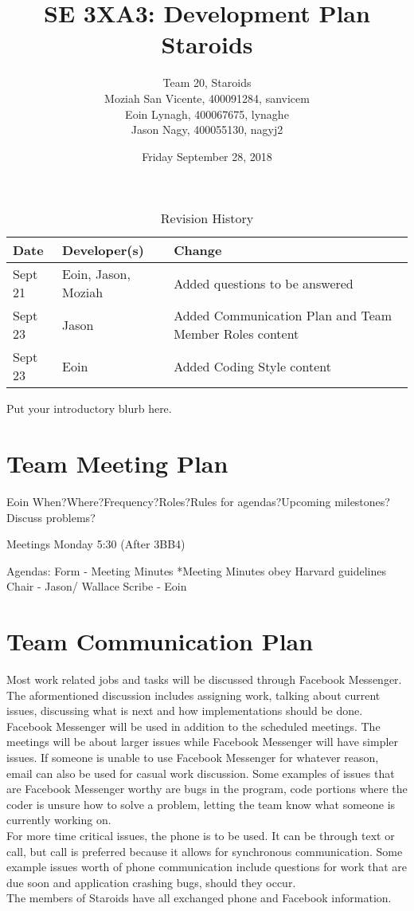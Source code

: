\documentclass{article}
\title{SE 3XA3: Development Plan\\Staroids}
\author{Team 20, Staroids
		\\ Moziah San Vicente, 400091284, sanvicem
		\\ Eoin Lynagh, 400067675, lynaghe
		\\ Jason Nagy, 400055130, nagyj2
}
\date{Friday September 28, 2018}
\begin{document}
\begin{table}[hp]
\caption{Revision History} \label{TblRevisionHistory}
\begin{tabularx}{\textwidth}{llX}
\toprule
\textbf{Date} & \textbf{Developer(s)} & \textbf{Change}\\
\midrule
Sept 21 & Eoin, Jason, Moziah & Added questions to be answered\\
Sept 23 & Jason & Added Communication Plan and Team Member Roles content\\
Sept 23 & Eoin & Added Coding Style content\\
\bottomrule
\end{tabularx}
\end{table}

\newpage

\maketitle

Put your introductory blurb here.

\section{Team Meeting Plan}
Eoin
When?Where?Frequency?Roles?Rules for agendas?Upcoming milestones?Discuss problems?

Meetings Monday 5:30 (After 3BB4)

Agendas:
Form - Meeting Minutes
*Meeting Minutes obey Harvard guidelines
Chair - Jason/ Wallace
Scribe - Eoin

\section{Team Communication Plan}
Most work related jobs and tasks will be discussed through Facebook Messenger. The aformentioned discussion includes assigning work, talking about current issues, discussing what is next and how implementations should be done. Facebook Messenger will be used in addition to the scheduled meetings. The meetings will be about larger issues while Facebook Messenger will have simpler issues. If someone is unable to use Facebook Messenger for whatever reason, email can also be used for casual work discussion. Some examples of issues that are Facebook Messenger worthy are bugs in the program, code portions where the coder is unsure how to solve a problem, letting the team know what someone is currently working on.\\
For more time critical issues, the phone is to be used. It can be through text or call, but call is preferred because it allows for synchronous communication. Some example issues worth of phone communication include questions for work that are due soon and application crashing bugs, should they occur.\\
The members of Staroids have all exchanged phone and Facebook information.\\
\end{document}
